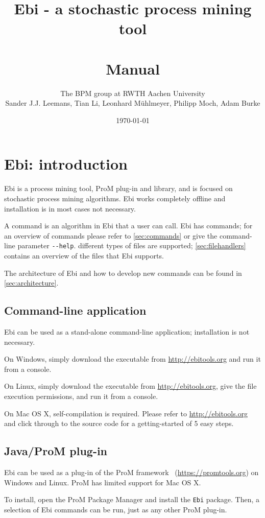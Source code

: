 \documentclass{book}
\title{Ebi - a stochastic process mining tool\\{\small\version}\\Manual}
\author{The BPM group at RWTH Aachen University\\
Sander J.J. Leemans, Tian Li, Leonhard Mühlmeyer, Philipp Moch, Adam Burke}
\date{\today}
\begin{document}
\maketitle

\tableofcontents

\clearpage
\chapter{Ebi: introduction}
	Ebi is a process mining tool, ProM plug-in and library, and is focused on stochastic process mining algorithms.
	Ebi works completely offline and installation is in most cases not necessary.
		
	A command is an algorithm in Ebi that a user can call.
	Ebi has \numberofcommands{} commands; for an overview of commands please refer to \cref{sec:commands} or give the command-line parameter \verb=--help=.
	\numberoffilehandlers{} different types of files are supported; \cref{sec:filehandlers} contains an overview of the files that Ebi supports.
	
	The architecture of Ebi and how to develop new commands can be found in \cref{sec:architecture}.
	
	\section{Command-line application}
		Ebi can be used as a stand-alone command-line application; installation is not necessary.
		
		On Windows, simply download the executable from \url{http://ebitools.org} and run it from a console.
		
		On Linux, simply download the executable from \url{http://ebitools.org}, give the file execution permissions, and run it from a console.
		
		On Mac OS X, self-compilation is required. 
		Please refer to \url{http://ebitools.org} and click through to the source code for a getting-started of 5 easy steps.
		
	\section{Java/ProM plug-in}
		Ebi can be used as a plug-in of the ProM framework~\cite{DBLP:conf/bpm/VerbeekBDA10} (\url{https://promtools.org}) on Windows and Linux. 
		ProM has limited support for Mac OS X.
		
		To install, open the ProM Package Manager and install the \verb=Ebi= package.
		Then, a selection of Ebi commands can be run, just as any other ProM plug-in.
		
\end{document}
